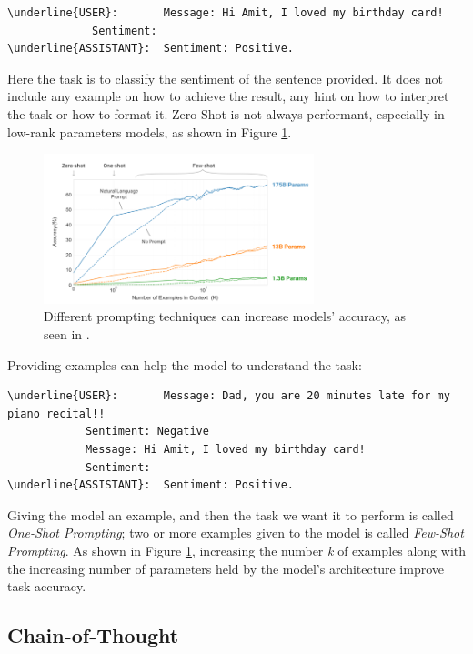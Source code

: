 \begin{Verbatim}[breaklines=true]
\underline{USER}:       Message: Hi Amit, I loved my birthday card!
             Sentiment:
\underline{ASSISTANT}:  Sentiment: Positive. 
\end{Verbatim}

Here the task is to classify the sentiment of the sentence provided. It does not include any example on how to achieve the result, any hint on how to interpret the task or how to format it. Zero-Shot is not always performant, especially in low-rank parameters models, as shown in Figure \ref{fig:prompting-accuracy}.

\begin{figure}[h]
    \centering
    \includegraphics[width=0.7\textwidth]{images/accuracy-prompting-techniques.png}
    \caption{Different prompting techniques can increase models' accuracy, as seen in \cite{brown2020language}.}
    \label{fig:prompting-accuracy}
\end{figure}

Providing examples can help the model to understand the task:

\begin{Verbatim}[breaklines=true]
\underline{USER}:       Message: Dad, you are 20 minutes late for my piano recital!!
            Sentiment: Negative
            Message: Hi Amit, I loved my birthday card!
            Sentiment:
\underline{ASSISTANT}:  Sentiment: Positive.
\end{Verbatim}

Giving the model an example, and then the task we want it to perform is called \textit{One-Shot Prompting}; two or more examples given to the model is called \textit{Few-Shot Prompting}. As shown in Figure \ref{fig:prompting-accuracy}, increasing the number \textit{k} of examples along with the increasing number of parameters held by the model's architecture improve task accuracy.


\subsection{Chain-of-Thought}
\label{sec:cot-prompting}


